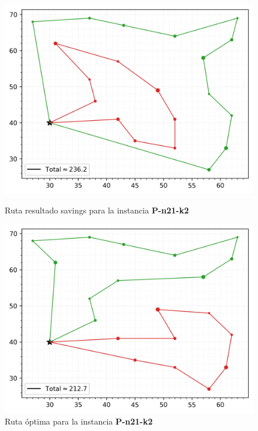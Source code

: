 \begin{figure}[H]
	\centering
	\begin{minipage}{0.35\textwidth}
		\centering
		\includegraphics[width=1\textwidth]{images/savings/malosavingchico}
		\caption{\footnotesize Ruta resultado savings para la instancia \textbf{P-n21-k2}}
		\label{fig:savings-malo-chico}
	\end{minipage}%
	\hspace{0.03\textwidth}
	\begin{minipage}{0.35\textwidth}
		\centering
		\includegraphics[width=1\textwidth]{images/savings/optimochico}
		\caption{\footnotesize Ruta óptima para la instancia \textbf{P-n21-k2}}
		\label{fig:savings-optimo-chico}
	\end{minipage}%
\end{figure}

